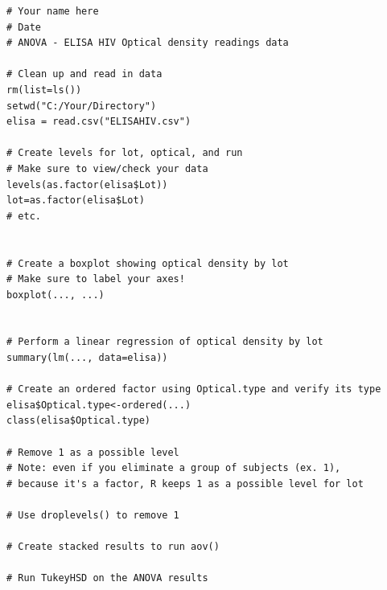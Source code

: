 \begin{lstlisting}
# Your name here
# Date
# ANOVA - ELISA HIV Optical density readings data

# Clean up and read in data
rm(list=ls())
setwd("C:/Your/Directory")
elisa = read.csv("ELISAHIV.csv")

# Create levels for lot, optical, and run
# Make sure to view/check your data
levels(as.factor(elisa$Lot))
lot=as.factor(elisa$Lot)
# etc.


# Create a boxplot showing optical density by lot
# Make sure to label your axes!
boxplot(..., ...)


# Perform a linear regression of optical density by lot
summary(lm(..., data=elisa))

# Create an ordered factor using Optical.type and verify its type
elisa$Optical.type<-ordered(...)
class(elisa$Optical.type)

# Remove 1 as a possible level
# Note: even if you eliminate a group of subjects (ex. 1),
# because it's a factor, R keeps 1 as a possible level for lot

# Use droplevels() to remove 1

# Create stacked results to run aov()

# Run TukeyHSD on the ANOVA results

\end{lstlisting}

